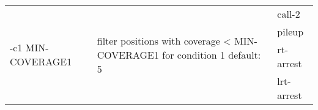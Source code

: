 {\small
\begin{tabular}{@{}p{}p{}l@{}}
\multirow{4}{=}{-c1 MIN-COVERAGE1} & \multirow{4}{=}{filter positions with coverage < MIN-COVERAGE1 for condition 1
default: 5} & call-2 \\
 &  & pileup \\
 &  & rt-arrest \\
 &  & lrt-arrest \\
\end{tabular}\\
}
